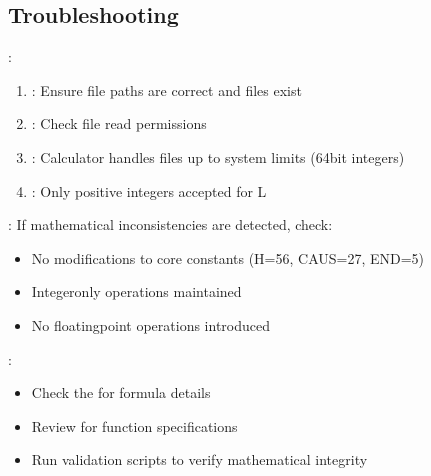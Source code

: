 \documentclass[letterpaper,10pt,english]{sphinxmanual}
\begin{document}
\subsection{Troubleshooting}
\label{\detokenize{quickstart:troubleshooting}}
\sphinxAtStartPar
{}:
\begin{enumerate}
%
\item {} 
\sphinxAtStartPar
{}: Ensure file paths are correct and files exist

\item {} 
\sphinxAtStartPar
{}: Check file read permissions

\item {} 
\sphinxAtStartPar
{}: Calculator handles files up to system limits (64\sphinxhyphen{}bit integers)

\item {} 
\sphinxAtStartPar
{}: Only positive integers accepted for L

\end{enumerate}

\sphinxAtStartPar
{}: If mathematical inconsistencies are detected, check:
\begin{itemize}
\item {} 
\sphinxAtStartPar
No modifications to core constants (H=56, CAUS=27, END=5)

\item {} 
\sphinxAtStartPar
Integer\sphinxhyphen{}only operations maintained

\item {} 
\sphinxAtStartPar
No floating\sphinxhyphen{}point operations introduced

\end{itemize}

\sphinxAtStartPar
{}:
\begin{itemize}
\item {} 
\sphinxAtStartPar
Check the {\hyperref[\detokenize{mathematical_foundation::doc}]{}} for formula details

\item {} 
\sphinxAtStartPar
Review {\hyperref[\detokenize{api_reference::doc}]{}} for function specifications

\item {} 
\sphinxAtStartPar
Run validation scripts to verify mathematical integrity

\end{itemize}
\end{document}
